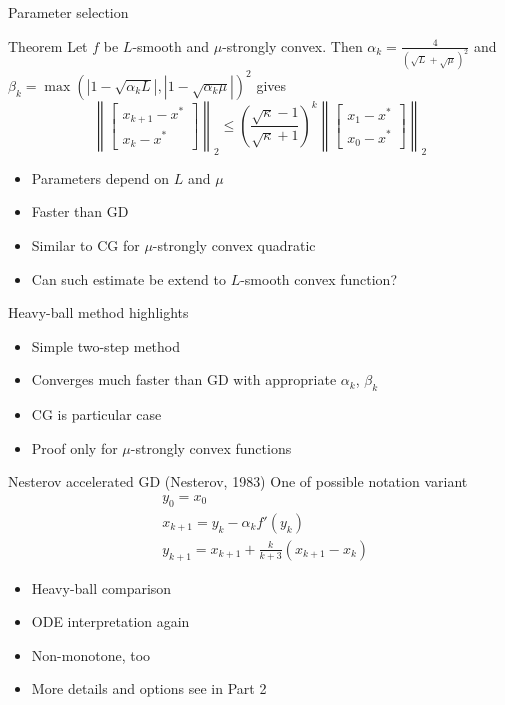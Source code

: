 \documentclass{beamer}
\begin{document}
\begin{frame}{Parameter selection}
\begin{block}{Theorem}
Let $f$ be $L$-smooth and $\mu$-strongly convex. Then $\alpha_k = \frac{4}{(\sqrt{L} + \sqrt{\mu})^2}$ and $\beta_k = \max(|1 - \sqrt{\alpha_k L}|, |1 - \sqrt{\alpha_k \mu}|)^2$ gives
\begin{equation*}
\left \|
\begin{bmatrix}
x_{k+1} - x^*\\
x_k - x^*
\end{bmatrix}
\right \|_2
\leq \left( \frac{\sqrt{\kappa} - 1}{\sqrt{\kappa} + 1} \right)^k
\left \|
\begin{bmatrix}
x_1 - x^*\\
x_0 - x^*
\end{bmatrix}
\right \|_2
\end{equation*}
\end{block}
\begin{itemize}
\item Parameters depend on $L$ and $\mu$
\item Faster than GD
\item Similar to CG for $\mu$-strongly convex quadratic
\item Can such estimate be extend to $L$-smooth convex function?
\end{itemize}
\end{frame}

\begin{frame}{Heavy-ball method highlights}
\begin{itemize}
\item Simple two-step method
\item Converges much faster than GD with appropriate $\alpha_k$, $\beta_k$
\item CG is particular case
\item Proof only for $\mu$-strongly convex functions
\end{itemize}
\end{frame}

\begin{frame}{Nesterov accelerated GD (Nesterov, 1983)}
One of possible notation variant
\begin{equation*}
\begin{split}
& y_0 = x_0 \\
& x_{k+1} = y_k - \alpha_k f'(y_k)\\
& y_{k+1} = x_{k+1} + \frac{k}{k + 3} (x_{k+1} - x_k)
\end{split}
\end{equation*}

\begin{itemize}
\item Heavy-ball comparison
\item ODE interpretation again
\item Non-monotone, too
\item More details and options see in Part 2
\end{itemize}
\end{frame}
\end{document}
